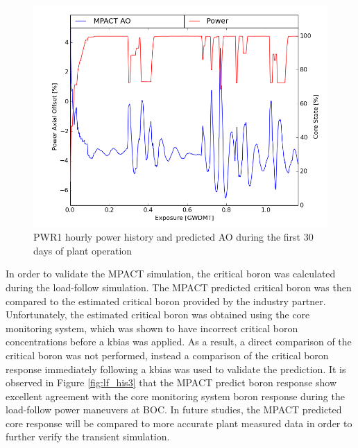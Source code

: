 \documentclass[edeposit,fullpage,11pt]{uiucthesis2009}
\begin{document}
\begin{figure}[h]
\includegraphics[trim={0 2cm 0 3.1cm},clip,width=0.85\linewidth]{./Figures/AO_1_clean.png} %
\caption{PWR1 hourly power history and predicted \gls{AO} during the first 30 days of plant operation}
\label{lf_his1}
\end{figure}

In order to validate the MPACT simulation, the critical boron was calculated during the load-follow simulation. 
The MPACT predicted critical boron was then compared to the estimated critical boron provided by the industry partner.
Unfortunately, the estimated critical boron was obtained using the core monitoring system, which was shown to have incorrect critical boron concentrations before a kbias was applied. 
As a result, a direct comparison of the critical boron was not performed, instead a comparison of the critical boron response immediately following a kbias was used to validate the prediction.
It is observed in Figure \ref{fig:lf_his3} that the MPACT predict boron response show excellent agreement with the core monitoring system boron response during the load-follow power maneuvers at \gls{BOC}.
In future studies, the MPACT predicted core response will be compared to more accurate plant measured data in order to further verify the transient simulation. 

\end{document}
